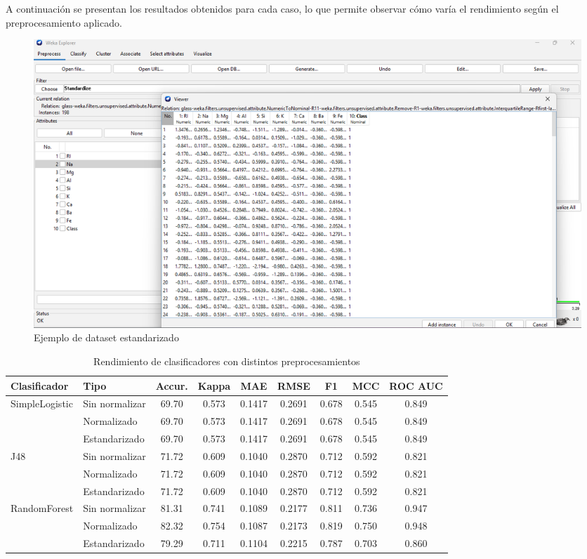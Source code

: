 \documentclass{article}
\begin{document}
A continuación se presentan los resultados obtenidos para cada caso, lo que permite observar cómo varía el rendimiento según el preprocesamiento aplicado.\\

\begin{figure}[!ht]
    \centering
    \includegraphics[width=1\linewidth]{Imágenes/standardized_dataset.png}
    \caption{Ejemplo de dataset estandarizado}
    \label{fig:standard-dataset}
\end{figure}

\begin{table}[H]
\centering
\caption{Rendimiento de clasificadores con distintos preprocesamientos}
\begin{tabularx}{\textwidth}{|X|l|c|c|c|c|c|c|c|}
\hline
\textbf{Clasificador} & \textbf{Tipo} & \textbf{Accur.} & \textbf{Kappa} & \textbf{MAE} & \textbf{RMSE} & \textbf{F1} & \textbf{MCC} & \textbf{ROC AUC} \\
\hline
\multirow{3}{*}{SimpleLogistic}
  & Sin normalizar & 69.70 & 0.573 & 0.1417 & 0.2691 & 0.678 & 0.545 & 0.849 \\
  & Normalizado    & 69.70 & 0.573 & 0.1417 & 0.2691 & 0.678 & 0.545 & 0.849 \\
  & Estandarizado  & 69.70 & 0.573 & 0.1417 & 0.2691 & 0.678 & 0.545 & 0.849 \\
\hline
\multirow{3}{*}{J48}
  & Sin normalizar & 71.72 & 0.609 & 0.1040 & 0.2870 & 0.712 & 0.592 & 0.821 \\
  & Normalizado    & 71.72 & 0.609 & 0.1040 & 0.2870 & 0.712 & 0.592 & 0.821 \\
  & Estandarizado  & 71.72 & 0.609 & 0.1040 & 0.2870 & 0.712 & 0.592 & 0.821 \\
\hline
\multirow{3}{*}{RandomForest}
  & Sin normalizar & 81.31 & 0.741 & 0.1089 & 0.2177 & 0.811 & 0.736 & 0.947 \\
  & Normalizado    & 82.32 & 0.754 & 0.1087 & 0.2173 & 0.819 & 0.750 & 0.948 \\
  & Estandarizado  & 79.29 & 0.711 & 0.1104 & 0.2215 & 0.787 & 0.703 & 0.860 \\
\hline
\end{tabularx}
\label{tab:clasificadores_comparados}
\end{table}
\end{document}
